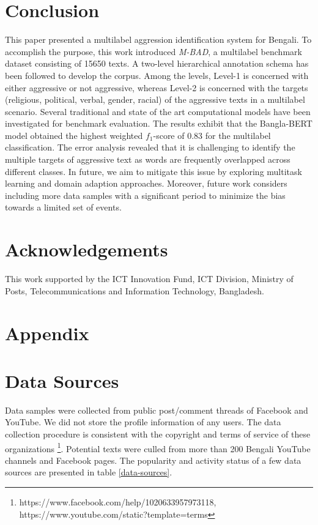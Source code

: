 \documentclass[11pt]{article}
\begin{document}
\section{Conclusion}
This paper presented a multilabel aggression identification system for Bengali. To accomplish the purpose, this work introduced \textit{M-BAD}, a multilabel benchmark dataset consisting of 15650 texts. A two-level hierarchical annotation schema has been followed to develop the corpus. Among the levels, Level-1 is concerned with either aggressive or not aggressive, whereas Level-2 is concerned with the targets (religious, political, verbal, gender, racial) of the aggressive texts in a multilabel scenario. Several traditional and state of the art computational models have been investigated for benchmark evaluation. The results exhibit that the Bangla-BERT model obtained the highest weighted $f_1$-score of 0.83 for the multilabel classification. The error analysis revealed that it is challenging to identify the multiple targets of aggressive text as words are frequently overlapped across different classes. In future, we aim to mitigate this issue by exploring multitask learning and domain adaption approaches. Moreover, future work considers including more data samples with a significant period to minimize the bias towards a limited set of events.      


\section*{Acknowledgements} This work supported by the ICT Innovation Fund, ICT Division, Ministry of Posts, Telecommunications and Information Technology, Bangladesh.









\appendix
{}


\section*{Appendix}
\section{Data Sources}
\label{source}
Data samples were collected from public post/comment threads of Facebook and YouTube. We did not store the profile information of any users. The data collection procedure is consistent with the copyright and terms of service of these organizations \footnote{https://www.facebook.com/help/1020633957973118, https://www.youtube.com/static?template=terms}. Potential texts were culled from more than 200 Bengali YouTube channels and Facebook pages. The popularity and activity status of a few data sources are presented in table \ref{data-sources}.
\end{document}
